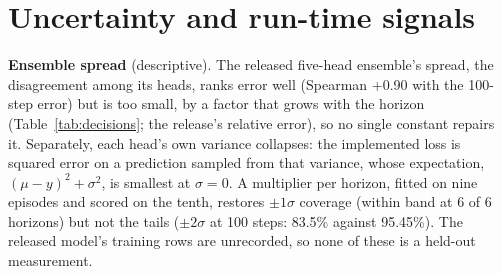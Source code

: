 \begin{table}[h]
\centering
\caption{Skill retained $K$ of fine-tuned narrow copies at 100 and 368 steps in the first run, its replication and
the pooled runs (95\% intervals); the unreduced control (pooled); and the registered label and difference for fine-tuning
against training from scratch at 368 steps.}
\label{tab:app-perc}
\footnotesize
\setlength{\tabcolsep}{3pt}
\end{table}

\FloatBarrier
\section{Uncertainty and run-time signals}\label{app:A6}
\textbf{Ensemble spread} (descriptive). The released five-head ensemble's spread, the disagreement among its heads,
ranks error well (Spearman +0.90 with the 100-step error) but is too small, by a factor that grows with
the horizon (Table~\ref{tab:decisions}; the release's relative error), so no single constant repairs it. Separately,
each head's own variance collapses: the implemented loss is squared error on a prediction sampled from that variance,
whose expectation, $(\mu-y)^2+\sigma^2$, is smallest at $\sigma=0$. A multiplier per horizon, fitted on nine episodes
and scored on the tenth, restores $\pm1\sigma$ coverage (within band at 6 of 6 horizons) but not the tails ($\pm2\sigma$ at 100
steps: 83.5\% against 95.45\%). The released model's training rows are unrecorded, so none of these
is a held-out measurement.

